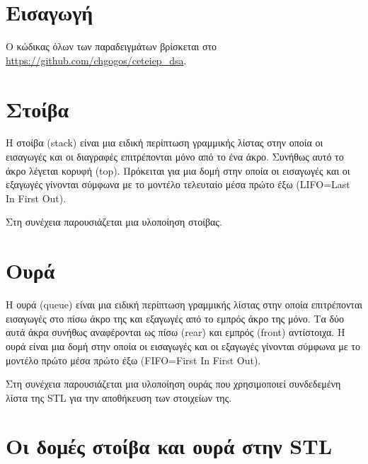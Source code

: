 \section{Εισαγωγή}
Ο κώδικας όλων των παραδειγμάτων βρίσκεται στο \href{https://github.com/chgogos/ceteiep_dsa}{https://github.com/chgogos/ceteiep\_dsa}.

\section{Στοίβα}
Η στοίβα (stack) είναι μια ειδική περίπτωση γραμμικής λίστας στην οποία οι εισαγωγές και οι διαγραφές επιτρέπονται μόνο από το ένα άκρο. Συνήθως αυτό το άκρο λέγεται κορυφή (top). Πρόκειται για μια δομή στην οποία οι εισαγωγές και οι εξαγωγές γίνονται σύμφωνα με το μοντέλο τελευταίο μέσα πρώτο έξω (LIFO=Last In First Out).

Στη συνέχεια παρουσιάζεται μια υλοποίηση στοίβας.




\section{Ουρά}
Η ουρά (queue) είναι μια ειδική περίπτωση γραμμικής λίστας στην οποία επιτρέπονται εισαγωγές στο πίσω άκρο της και εξαγωγές από το εμπρός άκρο της μόνο. Τα δύο αυτά άκρα συνήθως αναφέρονται ως
πίσω (rear) και εμπρός (front) αντίστοιχα. Η ουρά είναι μια δομή στην οποία οι εισαγωγές και οι εξαγωγές γίνονται σύμφωνα με το μοντέλο πρώτο μέσα πρώτο έξω (FIFO=First In First Out).

Στη συνέχεια παρουσιάζεται μια υλοποίηση ουράς που χρησιμοποιεί συνδεδεμένη λίστα της STL για την αποθήκευση των στοιχείων της.

\section{Οι δομές στοίβα και ουρά στην STL}
